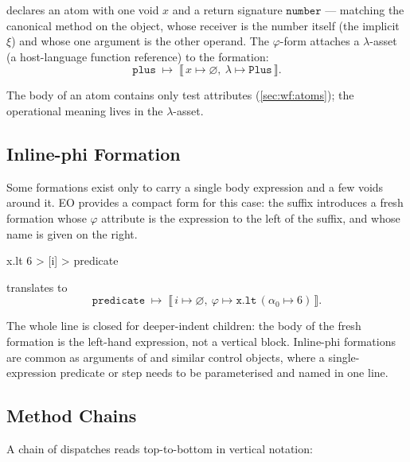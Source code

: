 declares an atom  with one void \(x\) and a return signature
  \(\mathtt{number}\) ---
  matching the canonical  method on the  object,
  whose receiver is the number itself (the implicit \(\xi\)) and whose
  one argument is the other operand.
The \(\varphi\)-form attaches a \(\lambda\)-asset
  (a host-language function reference) to the formation:
\begin{equation*}
  \mathtt{plus}\;\mapsto\;
    \llbracket\,
      x \mapsto \varnothing,\
      \lambda \mapsto \mathtt{Plus}
    \,\rrbracket.
\end{equation*}

The body of an atom contains only test attributes (\cref{sec:wf:atoms});
  the operational meaning lives in the \(\lambda\)-asset.

\subsection{Inline-phi Formation}\label{sec:over:inline-phi}

Some formations exist only to carry a single body expression and a few
  voids around it.
EO provides a compact form for this case: the suffix 
  introduces a fresh formation whose \(\varphi\) attribute is the
  expression to the left of the suffix, and whose name is given on the
  right.

\begin{ffcode}
x.lt 6 > [i] > predicate
\end{ffcode}

translates to
\begin{equation*}
  \mathtt{predicate}\;\mapsto\;
    \llbracket\,
      i \mapsto \varnothing,\
      \varphi \mapsto \mathtt{x}.\mathtt{lt}\,(\alpha_0 \mapsto 6)
    \,\rrbracket.
\end{equation*}

The whole line is closed for deeper-indent children: the body of the
  fresh formation is the left-hand expression, not a vertical block.
Inline-phi formations are common as arguments of \ff{while} and similar
  control objects, where a single-expression predicate or step needs to
  be parameterised and named in one line.

\subsection{Method Chains}\label{sec:over:chain}

A chain of dispatches reads top-to-bottom in vertical notation:

